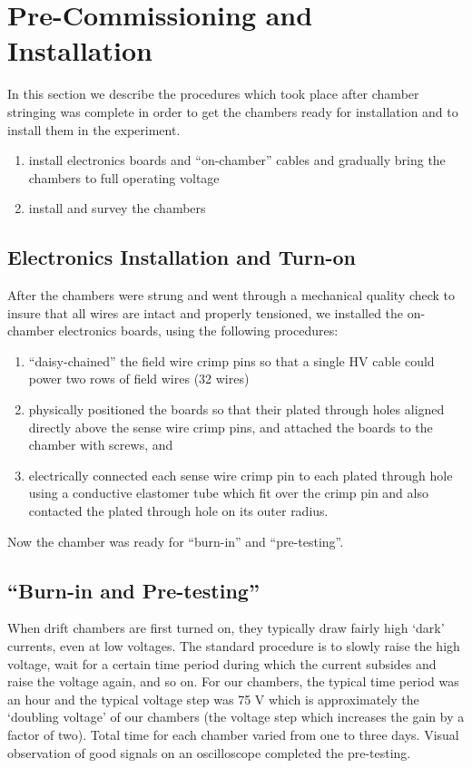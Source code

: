 \section{Pre-Commissioning and Installation}

In this section we describe the procedures which took
place after chamber stringing was complete in order to get the
chambers ready for installation and to install them 
in the experiment.

\begin{enumerate}
\item install electronics boards and ``on-chamber'' cables
and gradually bring the chambers to full operating voltage 
\item install and survey the chambers
\end{enumerate}

\subsection{Electronics Installation and Turn-on}
After the chambers were strung and went through a mechanical quality
check to insure that all wires are intact and properly tensioned, we
installed the on-chamber electronics boards, using
the following procedures:
\begin{enumerate}
\item ``daisy-chained'' the field wire crimp pins so that a single
HV cable could power two rows of field wires (32 wires)
\item physically positioned the boards so that their plated through
holes aligned directly above the sense wire crimp pins, and attached
the boards to the chamber with screws, and
\item electrically connected each sense wire crimp pin to each
plated through hole using a conductive elastomer tube which fit
over the crimp pin and also contacted the plated through hole on
its outer radius.
\end{enumerate}

Now the chamber was ready for ``burn-in'' and ``pre-testing''.

\subsection{``Burn-in and Pre-testing''}
When drift chambers are first turned on, they typically draw fairly high
`dark' currents, even at low voltages.  The standard procedure is to
slowly raise the high voltage, wait for a certain time period during
which the current subsides and raise the voltage again, and so on.
For our chambers, the typical time period was an hour and the typical
voltage step was 75 V which is approximately the `doubling voltage' of
our chambers (the voltage step which increases the gain by a factor
of two).  Total time for each chamber varied from one to three days.
Visual observation of good signals on an oscilloscope completed
the pre-testing.

